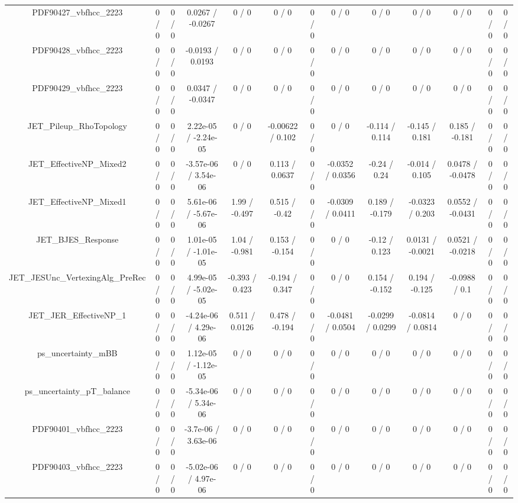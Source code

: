 \documentclass[10pt]{article}
\begin{document}
\begin{table}[htbp]
\begin{center}
\begin{tabular}{|c|c|c|c|c|c|c|c|c|c|c|c|c|}
  PDF90427_vbfhcc_2223 & 0 / 0 & 0 / 0 & 0.0267 / -0.0267 & 0 / 0 & 0 / 0 & 0 / 0 & 0 / 0 & 0 / 0 & 0 / 0 & 0 / 0 & 0 / 0 & 0 / 0 \\ 
  PDF90428_vbfhcc_2223 & 0 / 0 & 0 / 0 & -0.0193 / 0.0193 & 0 / 0 & 0 / 0 & 0 / 0 & 0 / 0 & 0 / 0 & 0 / 0 & 0 / 0 & 0 / 0 & 0 / 0 \\ 
  PDF90429_vbfhcc_2223 & 0 / 0 & 0 / 0 & 0.0347 / -0.0347 & 0 / 0 & 0 / 0 & 0 / 0 & 0 / 0 & 0 / 0 & 0 / 0 & 0 / 0 & 0 / 0 & 0 / 0 \\ 
  JET_Pileup_RhoTopology & 0 / 0 & 0 / 0 & 2.22e-05 / -2.24e-05 & 0 / 0 & -0.00622 / 0.102 & 0 / 0 & 0 / 0 & -0.114 / 0.114 & -0.145 / 0.181 & 0.185 / -0.181 & 0 / 0 & 0 / 0 \\ 
  JET_EffectiveNP_Mixed2 & 0 / 0 & 0 / 0 & -3.57e-06 / 3.54e-06 & 0 / 0 & 0.113 / 0.0637 & 0 / 0 & -0.0352 / 0.0356 & -0.24 / 0.24 & -0.014 / 0.105 & 0.0478 / -0.0478 & 0 / 0 & 0 / 0 \\ 
  JET_EffectiveNP_Mixed1 & 0 / 0 & 0 / 0 & 5.61e-06 / -5.67e-06 & 1.99 / -0.497 & 0.515 / -0.42 & 0 / 0 & -0.0309 / 0.0411 & 0.189 / -0.179 & -0.0323 / 0.203 & 0.0552 / -0.0431 & 0 / 0 & 0 / 0 \\ 
  JET_BJES_Response & 0 / 0 & 0 / 0 & 1.01e-05 / -1.01e-05 & 1.04 / -0.981 & 0.153 / -0.154 & 0 / 0 & 0 / 0 & -0.12 / 0.123 & 0.0131 / -0.0021 & 0.0521 / -0.0218 & 0 / 0 & 0 / 0 \\ 
  JET_JESUnc_VertexingAlg_PreRec & 0 / 0 & 0 / 0 & 4.99e-05 / -5.02e-05 & -0.393 / 0.423 & -0.194 / 0.347 & 0 / 0 & 0 / 0 & 0.154 / -0.152 & 0.194 / -0.125 & -0.0988 / 0.1 & 0 / 0 & 0 / 0 \\ 
  JET_JER_EffectiveNP_1 & 0 / 0 & 0 / 0 & -4.24e-06 / 4.29e-06 & 0.511 / 0.0126 & 0.478 / -0.194 & 0 / 0 & -0.0481 / 0.0504 & -0.0299 / 0.0299 & -0.0814 / 0.0814 & 0 / 0 & 0 / 0 & 0 / 0 \\ 
  ps_uncertainty_mBB & 0 / 0 & 0 / 0 & 1.12e-05 / -1.12e-05 & 0 / 0 & 0 / 0 & 0 / 0 & 0 / 0 & 0 / 0 & 0 / 0 & 0 / 0 & 0 / 0 & 0 / 0 \\ 
  ps_uncertainty_pT_balance & 0 / 0 & 0 / 0 & -5.34e-06 / 5.34e-06 & 0 / 0 & 0 / 0 & 0 / 0 & 0 / 0 & 0 / 0 & 0 / 0 & 0 / 0 & 0 / 0 & 0 / 0 \\ 
  PDF90401_vbfhcc_2223 & 0 / 0 & 0 / 0 & -3.7e-06 / 3.63e-06 & 0 / 0 & 0 / 0 & 0 / 0 & 0 / 0 & 0 / 0 & 0 / 0 & 0 / 0 & 0 / 0 & 0 / 0 \\ 
  PDF90403_vbfhcc_2223 & 0 / 0 & 0 / 0 & -5.02e-06 / 4.97e-06 & 0 / 0 & 0 / 0 & 0 / 0 & 0 / 0 & 0 / 0 & 0 / 0 & 0 / 0 & 0 / 0 & 0 / 0 \\ 

\end{tabular}
\end{center}
\end{table}
\end{document}

